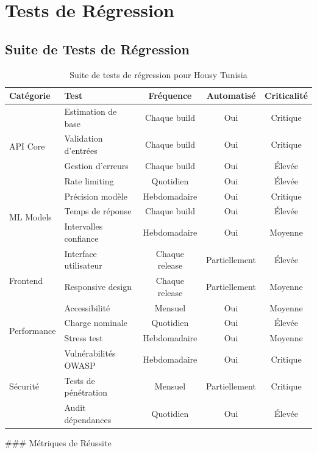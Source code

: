 \section{Tests de Régression}

\subsection{Suite de Tests de Régression}

\begin{table}[H]
\centering
\caption{Suite de tests de régression pour Housy Tunisia}
\begin{tabular}{|l|l|c|c|c|}
\hline
\textbf{Catégorie} & \textbf{Test} & \textbf{Fréquence} & \textbf{Automatisé} & \textbf{Criticalité} \\
\hline
\multirow{4}{*}{API Core} & Estimation de base & Chaque build & Oui & Critique \\
& Validation d'entrées & Chaque build & Oui & Critique \\
& Gestion d'erreurs & Chaque build & Oui & Élevée \\
& Rate limiting & Quotidien & Oui & Élevée \\
\hline
\multirow{3}{*}{ML Models} & Précision modèle & Hebdomadaire & Oui & Critique \\
& Temps de réponse & Chaque build & Oui & Élevée \\
& Intervalles confiance & Hebdomadaire & Oui & Moyenne \\
\hline
\multirow{3}{*}{Frontend} & Interface utilisateur & Chaque release & Partiellement & Élevée \\
& Responsive design & Chaque release & Partiellement & Moyenne \\
& Accessibilité & Mensuel & Oui & Moyenne \\
\hline
\multirow{2}{*}{Performance} & Charge nominale & Quotidien & Oui & Élevée \\
& Stress test & Hebdomadaire & Oui & Moyenne \\
\hline
\multirow{3}{*}{Sécurité} & Vulnérabilités OWASP & Hebdomadaire & Oui & Critique \\
& Tests de pénétration & Mensuel & Partiellement & Critique \\
& Audit dépendances & Quotidien & Oui & Élevée \\
\hline
\end{tabular}
\end{table}

### Métriques de Réussite

